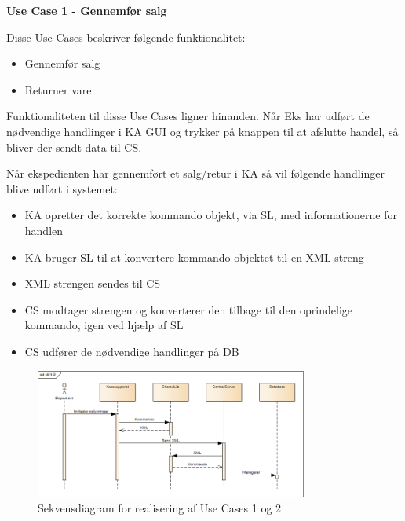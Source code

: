 \textbf{Use Case 1 - Gennemfør salg}

Disse Use Cases beskriver følgende funktionalitet:
\begin{itemize}
	\item Gennemfør salg
	\item Returner vare
\end{itemize}
Funktionaliteten til disse Use Cases ligner hinanden. Når \gls{Eks} har udført de nødvendige
handlinger i \gls{KA} \gls{GUI} og trykker på knappen til at afslutte handel, så bliver der sendt data til \gls{CS}.

Når ekspedienten har gennemført et salg/retur i \gls{KA} så vil følgende
handlinger blive udført i systemet:
\begin{itemize}
	\item \gls{KA} opretter det korrekte kommando objekt, via \gls{SL}, med informationerne for handlen
	\item \gls{KA} bruger \gls{SL} til at konvertere kommando objektet til en XML streng
	\item XML strengen sendes til \gls{CS}
	\item \gls{CS} modtager strengen og konverterer den tilbage til den oprindelige kommando, igen ved hjælp af \gls{SL}
	\item \gls{CS} udfører de nødvendige handlinger på \gls{DB}
\end{itemize}

\begin{figure}[H]
	\centering
	\includegraphics[width=0.8\textwidth]{Systemarkitektur/LogiskView/Realiseringer/Images/UC12.png}
	\caption{Sekvensdiagram for realisering af Use Cases 1 og 2}
	\label{fig:uc38sq}
\end{figure}

